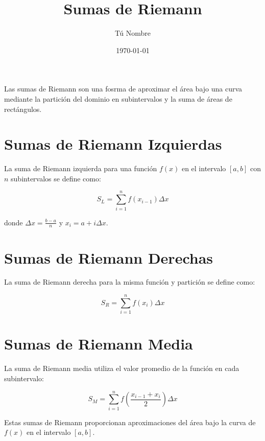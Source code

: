\documentclass{article}
\begin{document}
\title{Sumas de Riemann}
\author{Tú Nombre}
\date{\today}
\maketitle

Las sumas de Riemann son una fosrma de aproximar el área bajo una curva mediante la partición del dominio en subintervalos y la suma de áreas de rectángulos.

\section{Sumas de Riemann Izquierdas}

La suma de Riemann izquierda para una función $f(x)$ en el intervalo $[a, b]$ con $n$ subintervalos se define como:

\[
S_L = \sum_{i=1}^{n} f(x_{i-1}) \Delta x
\]

donde $\Delta x = \frac{b-a}{n}$ y $x_i = a + i \Delta x$.

\section{Sumas de Riemann Derechas}

La suma de Riemann derecha para la misma función y partición se define como:

\[
S_R = \sum_{i=1}^{n} f(x_i) \Delta x
\]

\section{Sumas de Riemann Media}

La suma de Riemann media utiliza el valor promedio de la función en cada subintervalo:

\[
S_M = \sum_{i=1}^{n} f\left(\frac{x_{i-1}+x_i}{2}\right) \Delta x
\]

Estas sumas de Riemann proporcionan aproximaciones del área bajo la curva de $f(x)$ en el intervalo $[a, b]$.
\end{document}
